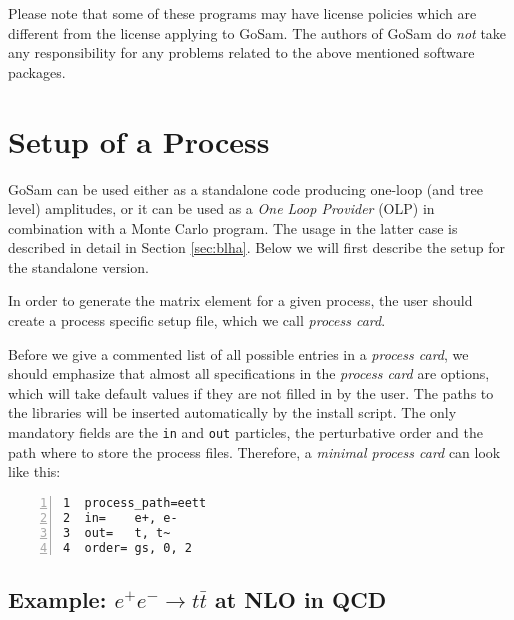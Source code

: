\documentclass[11pt,a4paper]{refrep}
\newcommand{\gosamversion}{{2{.}0}}
\newcommand{\gosam}{{\sc GoSam}\xspace}
\newcommand{\gosamv}[1][\gosamversion]{{\sc GoSam}\xspace}
\begin{document}
\attention Please note that some of these programs may have
license policies which are different from the license
applying to \gosamv. The authors of \gosamv do \emph{not}
take any responsibility for any problems related to the
above mentioned software packages.



\chapter{Setup of a Process}
\label{chp:setup-of-a-process}


\gosam{} can be used either as a standalone code producing one-loop 
(and tree level) amplitudes, or it can be used as a {\it One Loop Provider} (OLP)
in combination with a Monte Carlo program. 
The usage in the latter case is described in detail in Section \ref{sec:blha}. 
Below we will first describe the setup for the standalone version.


In order to generate the matrix element for a given process, the user should
create a process specific setup file, which we call {\em process card}. 


Before we give a commented list of all possible entries in a {\em process card}, 
we should emphasize that almost all specifications 
in the {\em process card} are options, which will take default values if they are not 
filled in by the user. The paths to the libraries will be inserted 
automatically by the install script.
The only mandatory fields are the {\tt in} and {\tt out} 
particles, the perturbative order and the path where to store the process files.
Therefore, a {\em minimal process card} can look like this:
\begin{lstlisting}[gobble=3,%
     numbers=left,caption={{\tt eett.in}},%
     basicstyle=\ttfamily]
1  process_path=eett
2  in=    e+, e-
3  out=   t, t~
4  order= gs, 0, 2
\end{lstlisting}


\section{Example: \texorpdfstring{$e^+e^-\rightarrow t\bar{t}$}{e+e- to tt-bar}
at NLO in QCD}
\end{document}
